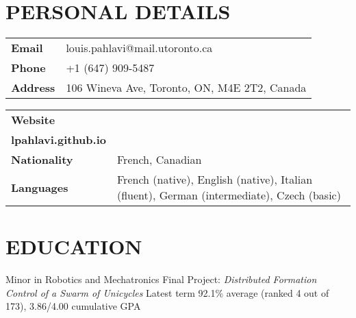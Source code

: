 \documentclass{ResumeTemplate}
\begin{document}
	
	
	\section{PERSONAL DETAILS}

	\noindent\begin{minipage}[c]{0.40\linewidth} 

	\noindent\begin{tabularx}{\linewidth}{>{\bfseries}l X}
	    Email &  louis.pahlavi@mail.utoronto.ca\\
	    Phone & +1 (647) 909-5487 \\
	    Address & 106 Wineva Ave, Toronto, ON, M4E 2T2, Canada \\
	\end{tabularx}

	\end{minipage}
	\noindent\begin{minipage}[c]{0.60\linewidth} 

	\noindent\begin{tabularx}{\linewidth}{>{\bfseries}l X}
	    Website & \href{https:\\lpahlavi.github.io}{lpahlavi.github.io} \\
	    Nationality & French, Canadian \\
	    Languages & French (native), English (native), Italian (fluent), German (intermediate), Czech (basic) \\
	\end{tabularx}
	
	\end{minipage}

	\section{EDUCATION}
	
	\workitemsfour
	{Minor in Robotics and Mechatronics}
	{Final Project: \textit{Distributed Formation Control of a Swarm of Unicycles}}
	{Latest term 92.1\% average (ranked 4 out of 173), 3.86/4.00 cumulative GPA}
	
\end{document}

